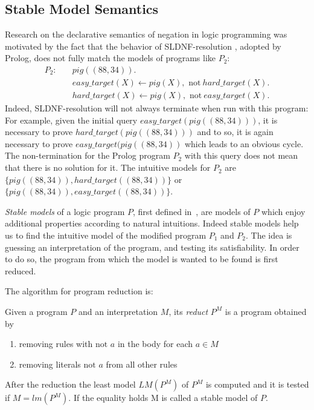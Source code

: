 \subsection{Stable Model Semantics}
Research on the declarative semantics of negation in logic programming was motivated by the fact that the behavior of SLDNF-resolution \cite{}, adopted by Prolog,  does not fully match the models of programs like \(P_2\):
\begin{align}
  P_2 \colon \quad
&\mathit{pig}((88,34)). \\
&\mathit{easy\_target}(X) \leftarrow pig(X), \text{ not}\: \mathit{hard\_target}(X). \label{eq:3}\\ 
&\mathit{hard\_target}(X) \leftarrow pig(X), \text{ not}\: \mathit{easy\_target}(X). \label{eq:4}
\end{align}
Indeed, SLDNF-resolution will not always terminate when run with this program: For example, given the initial query \(\mathit{easy\_target}(pig((88,34)))\), it is necessary to prove \(\mathit{hard\_target}(pig((88,34)))\) and to so, it is again necessary to prove \(\mathit{easy\_target}(pig((88,34))\) which leads to an obvious cycle.
The non-termination for the Prolog program \(P_2\) with this query does not mean that there is no solution for it. The intuitive models for \(P_2\) are \(\{pig((88,34)), \mathit{hard\_target}((88,34))\}\) or \(\{pig((88,34)), \mathit{easy\_target}((88,34))\}\).

\emph{Stable models} of a logic program \(P\), first defined in~\cite{Gelfond-Lifschitz}, are models of \(P\) which enjoy additional properties according to natural intuitions.
Indeed stable models help us to find the intuitive model of the modified program \(P_1\) and \(P_2\). The idea is guessing an interpretation of the program, and testing its satisfiability. In order to do so, the program from which the model is wanted to be found is first reduced. 

The algorithm for program reduction is:

Given a program \(P\) and an interpretation \(M\), its \emph{reduct} \(P^M\) is a program obtained by 
\begin{enumerate} 
\item removing rules with \(\text{not } a\) in the body for each \(a \in M\)
\item removing literals \(\text{not } a\) from all other rules %
\end{enumerate}
After the reduction the least model \(LM(P^M)\) of \(P^M\) is computed and it is tested if \(M = lm(P^M)\). If the equality holds M is called a stable model of \(P\).

